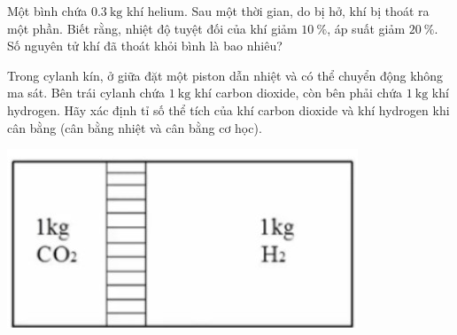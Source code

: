 \begin{ex}
Một bình chứa $\SI{0.3}{\kilogram}$ khí helium. Sau một thời gian, do bị hở, khí bị thoát ra một phần. Biết rằng, nhiệt độ tuyệt đối của khí giảm $\SI{10}{\percent}$, áp suất giảm $\SI{20}{\percent}$. Số nguyên tử khí đã thoát khỏi bình là bao nhiêu?
	
\end{ex}
\begin{ex}
Trong cylanh kín, ở giữa đặt một piston dẫn nhiệt và có thể chuyển động không ma sát. Bên trái cylanh chứa $\SI{1}{\kilogram}$ khí carbon dioxide, còn bên phải chứa $\SI{1}{\kilogram}$ khí hydrogen. Hãy xác định tỉ số thể tích của khí carbon dioxide và khí hydrogen khi cân bằng (cân bằng nhiệt và cân bằng cơ học).
\begin{center}
	\includegraphics[width=0.3\linewidth]{figs/VN12-Y24-PH-SYL-013P-1}
\end{center}
	
\end{ex}
